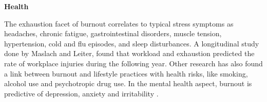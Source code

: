 \textbf{Health}

The exhaustion facet of burnout correlates to typical stress symptoms as headaches, chronic fatigue, gastrointestinal disorders, muscle tension, hypertension, cold and flu episodes, and sleep disturbances. A longitudinal study done by Maslach and Leiter, found that workload and exhaustion predicted the rate of workplace injuries during the following year. Other research has also found a link between burnout and lifestyle practices with health risks, like smoking, alcohol use and psychotropic drug use.  %
In the mental health aspect, burnout is predictive of depression, anxiety and irritability \parencite[50]{maslach_understanding_2017}. %
